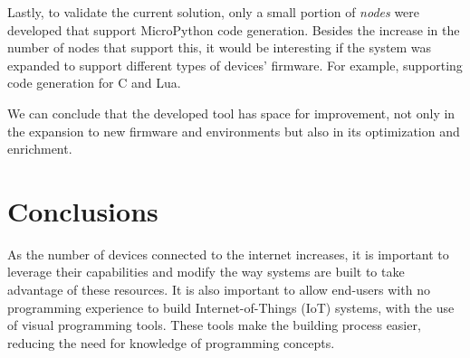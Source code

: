 Lastly, to validate the current solution, only a small portion of \textit{nodes} were developed that support MicroPython code generation. Besides the increase in the number of nodes that support this, it would be interesting if the system was expanded to support different types of devices' firmware. For example, supporting code generation for C and Lua.

We can conclude that the developed tool has space for improvement, not only in the expansion to new firmware and environments but also in its optimization and enrichment.





\section{Conclusions}\label{sec:conclusion_conclusions}

As the number of devices connected to the internet increases, it is important to leverage their capabilities and modify the way systems are built to take advantage of these resources. It is also important to allow end-users with no programming experience to build Internet-of-Things (IoT) systems, with the use of visual programming tools. These tools make the building process easier, reducing the need for knowledge of programming concepts.

